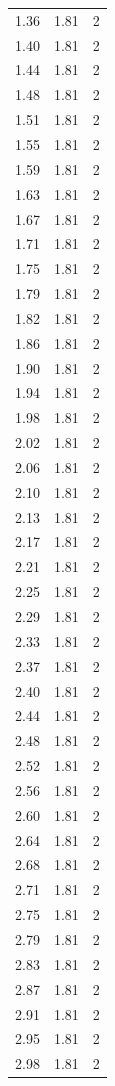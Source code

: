 \begin{longtable}{lrr}
  1.36 & 1.81 & 2 \\
  1.40 & 1.81 & 2 \\
  1.44 & 1.81 & 2 \\
  1.48 & 1.81 & 2 \\
  1.51 & 1.81 & 2 \\
  1.55 & 1.81 & 2 \\
  1.59 & 1.81 & 2 \\
  1.63 & 1.81 & 2 \\
  1.67 & 1.81 & 2 \\
  1.71 & 1.81 & 2 \\
  1.75 & 1.81 & 2 \\
  1.79 & 1.81 & 2 \\
  1.82 & 1.81 & 2 \\
  1.86 & 1.81 & 2 \\
  1.90 & 1.81 & 2 \\
  1.94 & 1.81 & 2 \\
  1.98 & 1.81 & 2 \\
  2.02 & 1.81 & 2 \\
  2.06 & 1.81 & 2 \\
  2.10 & 1.81 & 2 \\
  2.13 & 1.81 & 2 \\
  2.17 & 1.81 & 2 \\
  2.21 & 1.81 & 2 \\
  2.25 & 1.81 & 2 \\
  2.29 & 1.81 & 2 \\
  2.33 & 1.81 & 2 \\
  2.37 & 1.81 & 2 \\
  2.40 & 1.81 & 2 \\
  2.44 & 1.81 & 2 \\
  2.48 & 1.81 & 2 \\
  2.52 & 1.81 & 2 \\
  2.56 & 1.81 & 2 \\
  2.60 & 1.81 & 2 \\
  2.64 & 1.81 & 2 \\
  2.68 & 1.81 & 2 \\
  2.71 & 1.81 & 2 \\
  2.75 & 1.81 & 2 \\
  2.79 & 1.81 & 2 \\
  2.83 & 1.81 & 2 \\
  2.87 & 1.81 & 2 \\
  2.91 & 1.81 & 2 \\
  2.95 & 1.81 & 2 \\
  2.98 & 1.81 & 2 \\

\end{longtable}
